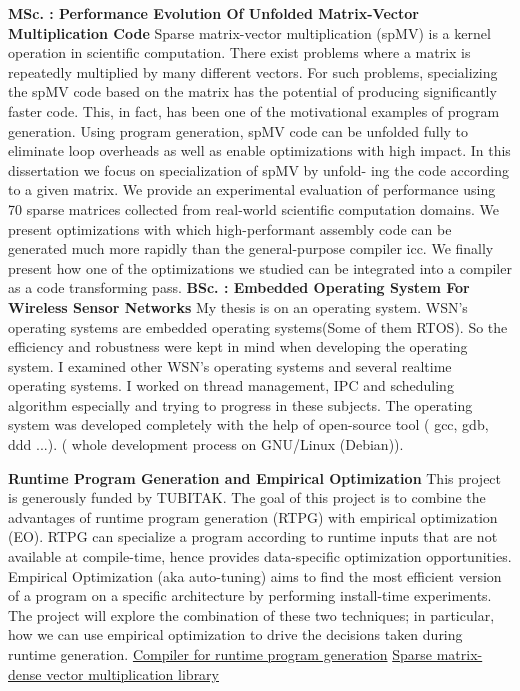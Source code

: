 \documentclass[12pt,letterpaper]{article}
\newcommand{\mhead}[1]{\leavevmode\marginpar{\sffamily\footnotesize #1}}
\begin{document}
\reversemarginpar\setlength\marginparwidth{0.85in}
\mhead{Thesis}%
\textbf{MSc. : Performance Evolution Of Unfolded Matrix-Vector Multiplication Code} \newline
Sparse matrix-vector multiplication (spMV) is a kernel operation in scientific
computation. There exist problems where a matrix is repeatedly multiplied by many
different vectors. For such problems, specializing the spMV code based on the matrix
has the potential of producing significantly faster code. This, in fact, has been one of
the motivational examples of program generation. Using program generation, spMV
code can be unfolded fully to eliminate loop overheads as well as enable optimizations
with high impact. In this dissertation we focus on specialization of spMV by unfold-
ing the code according to a given matrix. We provide an experimental evaluation of
performance using 70 sparse matrices collected from real-world scientific computation
domains. We present optimizations with which high-performant assembly code can be
generated much more rapidly than the general-purpose compiler icc. We finally
present how one of the optimizations we studied can be integrated into a compiler as a
code transforming pass.
\newline\newline
\textbf{BSc. : Embedded Operating System For Wireless Sensor Networks}\newline
My thesis is on an operating system. WSN’s operating systems are embedded
operating systems(Some of them RTOS). So the efficiency and robustness were kept
in mind when developing the operating system. I examined other WSN’s operating
systems and several realtime operating systems. I worked on thread management, IPC
and scheduling algorithm especially and trying to progress in these subjects. The
operating system was developed completely with the help of open-source tool ( gcc,
gdb, ddd ...). ( whole development process on GNU/Linux (Debian)).

\bigskip
\mhead{Recently worked on\newline Projects}%
\textbf{Runtime Program Generation and Empirical Optimization}\newline
This project is generously funded by TUBITAK.
The goal of this project is to combine the advantages of runtime program generation
(RTPG) with empirical optimization (EO). RTPG can specialize a program according
to runtime inputs that are not available at compile-time, hence provides data-specific
optimization opportunities. Empirical Optimization (aka auto-tuning) aims to find the
most efficient version of a program on a specific architecture by performing install-time
experiments. The project will explore the combination of these two techniques; in
particular, how we can use empirical optimization to drive the decisions taken during
runtime generation.
\newline
\href{http://srl.ozyegin.edu.tr/projects/rtpg4llvm}{Compiler for runtime program generation}\newline
\href{http://srl.ozyegin.edu.tr/projects/spMVlib/}{Sparse matrix-dense vector multiplication library}
\end{document}
